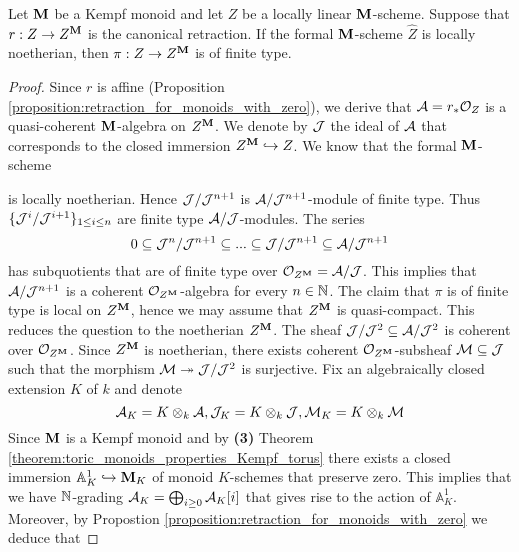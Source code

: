 \begin{theorem}
Let $\mathbf{M}$ be a Kempf monoid and let $Z$ be a locally linear $\mathbf{M}$-scheme. Suppose that $r:Z\rightarrow Z^{\mathbf{M}}$ is the canonical retraction. If the formal $\mathbf{M}$-scheme $\widehat{Z}$ is locally noetherian, then $\pi:Z\rightarrow Z^{\mathbf{M}}$ is of finite type.
\end{theorem}
\begin{proof}
Since $r$ is affine (Proposition \ref{proposition:retraction_for_monoids_with_zero}), we derive that ${\mathcal A} = r_*{\mathcal O}_Z$ is a quasi-coherent $\mathbf{M}$-algebra on $Z^{\mathbf{M}}$. We denote by ${\mathcal J}$ the ideal of ${\mathcal A}$ that corresponds to the closed immersion $Z^{\mathbf{M}}\hookrightarrow Z$. We know that the formal $\mathbf{M}$-scheme
\begin{center}
\end{center}
is locally noetherian. Hence ${\mathcal J}/{\mathcal J}^{n+1}$ is ${\mathcal A}/{\mathcal J}^{n+1}$-module of finite type. Thus $\{{\mathcal J}^i/{\mathcal J}^{i+1}\}_{1\leq i\leq n}$ are finite type ${\mathcal A}/{\mathcal J}$-modules. The series
$$0 \subseteq {\mathcal J}^n/{\mathcal J}^{n+1} \subseteq  ... \subseteq {\mathcal J}/{\mathcal J}^{n+1} \subseteq {\mathcal A}/{\mathcal J}^{n+1}$$
has subquotients that are of finite type over ${\mathcal O}_{Z^{\mathbf{M}}} = {\mathcal A}/{\mathcal J}$. This implies that ${\mathcal A}/{\mathcal J}^{n+1}$ is a coherent ${\mathcal O}_{Z^{\mathbf{M}}}$-algebra for every $n\in {\mathbb N}$. The claim that $\pi$ is of finite type is local on $Z^{\mathbf{M}}$, hence we may assume that $Z^{\mathbf{M}}$ is quasi-compact. This reduces the question to the noetherian $Z^{\mathbf{M}}$. The sheaf ${\mathcal J}/{\mathcal J}^2\subseteq {\mathcal A}/{\mathcal J}^2$ is coherent over ${\mathcal O}_{Z^{\mathbf{M}}}$. Since $Z^{\mathbf{M}}$ is noetherian, there exists coherent ${\mathcal O}_{Z^{\mathbf{M}}}$-subsheaf ${\mathcal M}\subseteq {\mathcal J}$ such that the morphism ${\mathcal M}\twoheadrightarrow {\mathcal J}/{\mathcal J}^2$ is surjective. Fix an algebraically closed extension $K$ of $k$ and denote
$${\mathcal A}_K = K\otimes_k{\mathcal A},{\mathcal J}_K = K\otimes_k{\mathcal J},{\mathcal M}_K = K\otimes_k{\mathcal M}$$
Since $\mathbf{M}$ is a Kempf monoid and by \textbf{(3)} Theorem \ref{theorem:toric_monoids_properties_Kempf_torus} there exists a closed immersion $\mathbb{A}^1_K\hookrightarrow \mathbf{M}_K$ of monoid $K$-schemes that preserve zero. This implies that we have ${\mathbb N}$-grading ${\mathcal A}_K = \bigoplus_{i\geq 0}{\mathcal A}_K[i]$ that gives rise to the action of $\mathbb{A}^1_K$. Moreover, by Propostion \ref{proposition:retraction_for_monoids_with_zero} we deduce that

\end{proof}
